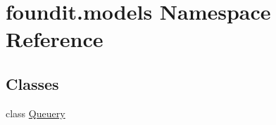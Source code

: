 \hypertarget{namespacefoundit_1_1models}{}\section{foundit.\+models Namespace Reference}
\label{namespacefoundit_1_1models}
\subsection*{Classes}
\begin{DoxyCompactItemize}
\item 
class \hyperlink{classfoundit_1_1models_1_1_queuery}{Queuery}
\end{DoxyCompactItemize}
